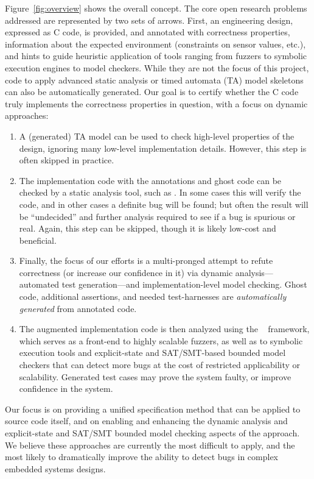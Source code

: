 Figure~\ref{fig:overview} shows the overall concept.  The core
open research problems addressed are represented by two sets of
arrows.  First, an engineering design, expressed as C code, is
provided, and annotated with correctness properties, information
about the expected environment (constraints on sensor values, etc.),
and hints to guide heuristic application of tools ranging from fuzzers
to symbolic execution engines to model checkers.
While they are not the focus of this project, code to apply advanced static analysis or timed
automata (TA) model skeletons can also be automatically generated.  
Our goal is to certify whether the C code truly implements the
correctness properties in question, with a focus on dynamic approaches:
\begin{enumerate}[labelsep=3pt,leftmargin=12pt]
\item A (generated) TA model can be used to check high-level properties
  of the design, ignoring many low-level implementation details. However, this step
  is often skipped in practice.
\item The implementation code with the \acsl annotations and ghost code
  can be checked by a static analysis tool, such as \framac.  In some
  cases this will verify the code, and in other cases a definite bug
  will be found; but often the result will be ``undecided'' and
  further analysis required to see if a bug is spurious or real.
 Again, this step can be skipped, though it is likely low-cost and beneficial.
\item Finally, the focus of our efforts is a multi-pronged attempt to refute correctness (or increase our confidence
  in it) via dynamic analysis---automated test generation---and
  implementation-level model checking.
  Ghost code, additional assertions, and needed test-harnesses are \emph{automatically generated} from 
  annotated code.
\item The augmented implementation code is then analyzed using the
  \deepstate~\cite{DeepState} framework, which serves as a front-end
  to highly scalable fuzzers, as well as to symbolic execution tools
  and explicit-state and SAT/SMT-based bounded model checkers that can
  detect more bugs at the cost of restricted applicability or scalability.  Generated test cases may
  prove the system faulty, or improve confidence in the system.
\end{enumerate}

Our focus is on providing a unified specification method that can be
applied to source code itself, and on enabling and enhancing the dynamic analysis and
explicit-state and SAT/SMT bounded model
checking aspects of the approach.  We believe these approaches are
currently the most difficult to apply, and the most likely to
dramatically improve the ability to detect bugs in complex embedded
systems designs.

